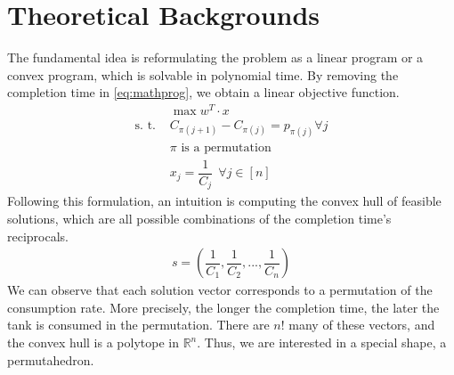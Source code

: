 \documentclass[12pt,letterpaper]{article}
\newcommand*{\R}{\mathbb{R}}
\begin{document}
\section{Theoretical Backgrounds}
The fundamental idea is reformulating the problem as a linear program or a convex program, which 
is solvable in polynomial time. By removing the completion time in \ref{eq:mathprog}, we obtain a
linear objective function. 
\begin{align*}
    &\max w^T \cdot x \label{eq:linobj} \tag{B} \\ 
    \text{s. t.\ }& C_{\pi(j+1)} - C_{\pi(j)} = p_{\pi(j)} \forall j \\
    & \pi \text{ is a permutation} \\ 
    & x_j = \dfrac{1}{C_j} \ \ \forall j \in [n] 
\end{align*}
Following this formulation, an intuition is
computing the convex hull of feasible solutions, which are all possible combinations of the completion time's reciprocals. 
\begin{align*}
 s = \left( \dfrac{1}{C_1}, \dfrac{1}{C_2}, ..., \dfrac{1}{C_n}\right)
\end{align*} 
We can observe that each solution vector corresponds to a permutation of the consumption rate. 
More precisely, the longer the completion time, the later the tank is consumed in the permutation.
There are $n!$ many of these vectors, and the convex hull is a polytope in $\R^n$. 
Thus, we are interested in a special shape, a permutahedron.
\end{document}
